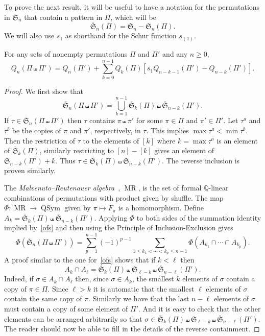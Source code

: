 \documentclass[ALCO,ThmDefs,Unicode,epreuves]{cedram}
\DeclareMathOperator{\MaR}{MR}
\newcommand{\shu}{\shuffle}
\newcommand{\ofS}{\ol{\fS}}
\newcommand{\ol}{\overline}
\newcommand{\ree}[1]{\eqref{#1}}
\newcommand{\ra}{\rightarrow}
\newcommand{\si}{\sigma}
\newcommand{\bbQ}{{\mathbb Q}}
\newcommand{\fS}{{\mathfrak S}}
\DeclareMathOperator{\QSym}{{QSym}}
\begin{document}
To prove the next result, it will be useful to have a notation for the permutations in $\fS_n$ that contain a pattern in $\Pi$, which will be
\[
\ofS_n(\Pi) = \fS_n - \fS_n(\Pi).
\]
We will also use $s_1$ as shorthand for the Schur function $s_{(1)}$.
\begin{theo}
\label{shu:thm}
 For any sets of nonempty permutations $\Pi$ and $\Pi'$ and any $n\ge0$,
\[
Q_n(\Pi \shuffle \Pi') = Q_n(\Pi') + \sum_{k=0}^{n-1} Q_k(\Pi) [s_1 Q_{n-k-1}(\Pi') - Q_{n-k}(\Pi')].
\]
\end{theo}
\begin{proof}
We first show that
\begin{equation}
\label{ofs}
\ofS_n(\Pi \shuffle \Pi') = \bigcup_{k=1}^{n-1} \ofS_k(\Pi) \shuffle \ofS_{n-k}(\Pi').
\end{equation}
If $\tau\in\ofS_n(\Pi \shuffle \Pi')$ then $\tau$ contains $\pi\shu\pi'$ for some $\pi\in\Pi$ and $\pi'\in\Pi'$. Let $\tau^a$ and $\tau^b$ be the copies of $\pi$ and $\pi'$, respectively, in $\tau$. This implies $\max\tau^a<\min\tau^b$. Then the restriction of $\tau$ to the elements of $[k]$ where $k=\max\tau^a$ is an element of $\ofS_k(\Pi)$, similarly restricting to $[n]-[k]$ gives an element of $\ofS_{n-k}(\Pi')+k$. Thus $\tau\in\ofS_k(\Pi) \shuffle \ofS_{n-k}(\Pi')$. The reverse inclusion is proven similarly.

The \emph{Malvenuto--Reutenauer algebra}~\cite{mr:dqf}, $\MaR$, is the set of formal $\bbQ$-linear combinations of permutations with product given by shuffle. The map $\Phi:\MaR\ra\QSym$ given by $\pi\mapsto F_\pi$ is a homomorphism. Define $A_k= \ofS_k(\Pi) \shuffle \ofS_{n-k}(\Pi')$. Applying $\Phi$ to both sides of the summation identity implied by~\ree{ofs} and then using the Principle of Inclusion-Exclusion gives
\begin{equation}
\label{Phi(shu)}
\Phi(\ofS_n(\Pi \shuffle \Pi'))= \sum_{p=1}^{n-1} (-1)^{p-1} \sum_{1 \leq k_1 < \cdots < k_{p} \leq n-1} \Phi(A_{k_1} \cap \cdots \cap A_{k_p}).
\end{equation}
A proof similar to the one for~\ree{ofs} shows that if $k<\ell$ then 
\begin{equation}
\label{AcapA}
A_k \cap A_{\ell} = \ofS_k(\Pi) \shuffle \fS_{\ell-k} \shuffle \ofS_{n-\ell}(\Pi').
\end{equation}
Indeed, if $\si\in A_k\cap A_{\ell}$ then, since $\si\in A_k$, the smallest $k$ elements of $\si$ contain a copy of $\pi\in\Pi$. Since 
$\ell>k$ it is automatic that the smallest $\ell$ elements of $\si$ contain the same copy of $\pi$. Similarly we have that the last $n-\ell$ elements of $\si$ must contain a copy of some element of $\Pi'$. And it is easy to check that the other elements can be arranged arbitrarily so that $\si\in\ofS_k(\Pi) \shuffle \fS_{\ell-k} \shuffle \ofS_{n-\ell}(\Pi')$. The reader should now be able to fill in the details of the reverse containment.



\end{proof}
\end{document}
